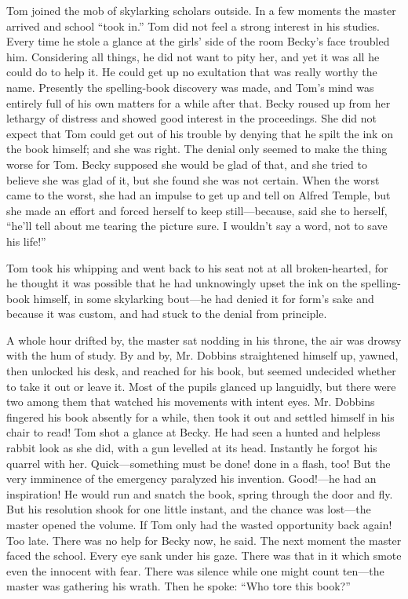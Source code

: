 \documentclass{book}
\begin{document}
Tom joined the mob of skylarking scholars outside. In a few moments the master arrived and school “took in.” Tom did not feel a strong interest in his studies. Every time he stole a glance at the girls’ side of the room Becky’s face troubled him. Considering all things, he did not want to pity her, and yet it was all he could do to help it. He could get up no exultation that was really worthy the name. Presently the spelling-book discovery was made, and Tom’s mind was entirely full of his own matters for a while after that. Becky roused up from her lethargy of distress and showed good interest in the proceedings. She did not expect that Tom could get out of his trouble by denying that he spilt the ink on the book himself; and she was right. The denial only seemed to make the thing worse for Tom. Becky supposed she would be glad of that, and she tried to believe she was glad of it, but she found she was not certain. When the worst came to the worst, she had an impulse to get up and tell on Alfred Temple, but she made an effort and forced herself to keep still—because, said she to herself, “he’ll tell about me tearing the picture sure. I wouldn’t say a word, not to save his life!”

Tom took his whipping and went back to his seat not at all broken-hearted, for he thought it was possible that he had unknowingly upset the ink on the spelling-book himself, in some skylarking bout—he had denied it for form’s sake and because it was custom, and had stuck to the denial from principle.

A whole hour drifted by, the master sat nodding in his throne, the air was drowsy with the hum of study. By and by, Mr. Dobbins straightened himself up, yawned, then unlocked his desk, and reached for his book, but seemed undecided whether to take it out or leave it. Most of the pupils glanced up languidly, but there were two among them that watched his movements with intent eyes. Mr. Dobbins fingered his book absently for a while, then took it out and settled himself in his chair to read! Tom shot a glance at Becky. He had seen a hunted and helpless rabbit look as she did, with a gun levelled at its head. Instantly he forgot his quarrel with her. Quick—something must be done! done in a flash, too! But the very imminence of the emergency paralyzed his invention. Good!—he had an inspiration! He would run and snatch the book, spring through the door and fly. But his resolution shook for one little instant, and the chance was lost—the master opened the volume. If Tom only had the wasted opportunity back again! Too late. There was no help for Becky now, he said. The next moment the master faced the school. Every eye sank under his gaze. There was that in it which smote even the innocent with fear. There was silence while one might count ten—the master was gathering his wrath. Then he spoke: “Who tore this book?”
\end{document}
